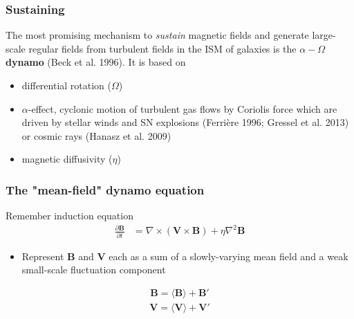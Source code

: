 \documentclass[10pt,aspectratio=169]{beamer}
\begin{document}
\begin{frame}
	\frametitle{Sustaining}
	The most promising mechanism to \textit{sustain} magnetic fields and generate large-scale regular fields from turbulent fields in the ISM of galaxies is the \textbf{$\alpha-\Omega$} \textbf{dynamo} (Beck et al. 1996). It is based on 
	\begin{itemize}
		\item differential rotation ($\Omega$)
		\item $\alpha$-effect, cyclonic motion of turbulent gas flows by Coriolis force which are driven by stellar winds and SN explosions (Ferrière 1996; Gressel et al. 2013) or cosmic rays (Hanasz et al. 2009)
		\item magnetic diffusivity ($\eta$)
	\end{itemize}
\end{frame}
\begin{frame}
	\frametitle{The "mean-field" dynamo equation}
	Remember induction equation
	\begin{align}
	\frac{\partial \mathbf{B}}{\partial t} &= \nabla \times \left( \mathbf{V} \times \mathbf{B} \right) + \eta \nabla^2 \mathbf{B}
	\end{align}
	\begin{itemize}
		\item Represent $\mathbf{B}$ and $\mathbf{V}$ each as a sum of a slowly-varying mean field and a weak small-scale fluctuation component
	\end{itemize}
	\begin{align}
		\mathbf{B} = \langle \mathbf{B} \rangle + \mathbf{B}'
	\end{align}
	\begin{align}
	\mathbf{V} = \langle \mathbf{V} \rangle + \mathbf{V}'
	\end{align}
\end{frame}
\end{document}
